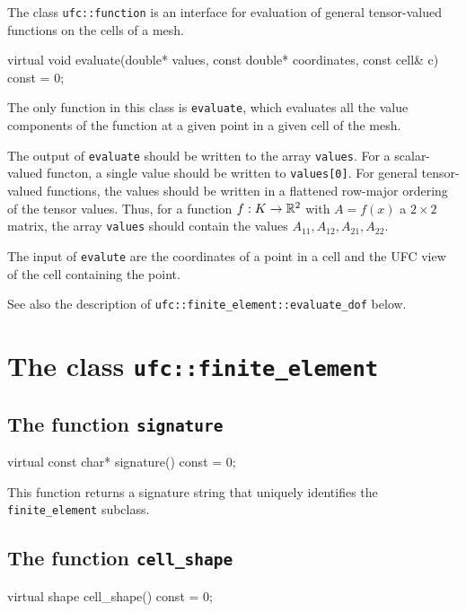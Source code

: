 The class \texttt{ufc::function} is an interface for evaluation of
general tensor-valued functions on the cells of a mesh.

\begin{code}
virtual void evaluate(double* values,
                      const double* coordinates,
                      const cell& c) const = 0;
\end{code}

The only function in this class is \texttt{evaluate},
which evaluates all the value components of the function at a given
point in a given cell of the mesh.

The output of \texttt{evaluate} should be written to the array
\texttt{values}. For a scalar-valued functon, a single value should be
written to \texttt{values[0]}. For general tensor-valued functions,
the values should be written in a flattened row-major ordering of the
tensor values. Thus, for a function $f : K \rightarrow \mathbb{R}^2$ with $A =
f(x)$ a $2 \times 2$ matrix, the array \texttt{values} should contain
the values $A_{11}, A_{12}, A_{21}, A_{22}$.

The input of \texttt{evalute} are the coordinates of a point in a cell and
the UFC view of the cell containing the point.

See also the description of \texttt{ufc::finite\_element::evaluate\_dof} below.

\section{The class \texttt{ufc::finite\_element}}

\subsection{The function \texttt{signature}}

\begin{code}
virtual const char* signature() const = 0;
\end{code}

This function returns a signature string that uniquely identifies the
\texttt{finite\_element} subclass.

\subsection{The function \texttt{cell\_shape}}

\begin{code}
virtual shape cell_shape() const = 0;
\end{code}

